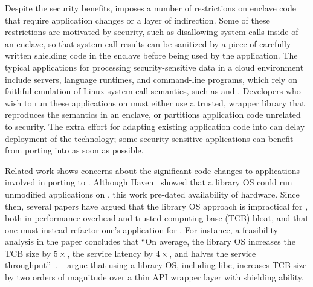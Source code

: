 Despite the security benefits,
\sgx{} imposes a number of restrictions on enclave code 
that require application changes
or a layer of indirection. %
Some of these restrictions are motivated by security, such as disallowing system calls
inside of an enclave, so that system call results can be sanitized by a piece of carefully-written shielding code in the enclave before being used by the application.
The typical applications
for processing security-sensitive data
in a cloud environment
include servers, language runtimes, and
command-line programs,
which rely on faithful emulation of Linux system call semantics, such as  and .
Developers who wish to run these applications on \sgx{}
must either use 
a trusted, wrapper library that reproduces the semantics in an enclave, or partitions application code
unrelated to security.
The extra effort for adapting existing application code
into \sgx{} can delay deployment of the technology; some security-sensitive applications
can benefit from porting into \sgx{} as soon as possible.






Related work shows concerns about the significant code changes to applications involved in porting to \sgx{}.
Although Haven~\cite{baumann14haven} showed that a library OS
could run unmodified applications on \sgx{}, this work pre-dated availability of \sgx{} hardware.
Since then, several papers have argued that the library OS approach is impractical for \sgx{},
both in performance overhead and trusted computing base (TCB) bloat, and that one must instead refactor one's application for \sgx{}.
For instance, a feasibility analysis in the \scone{} paper
concludes that ``On average, the library OS increases the TCB size by $5\times$, the service latency by $4\times$,
and halves the service throughput''~\cite{osdi16scone}.
~\citet{shinde17panoply} argue that using a library OS, including libc, increases TCB size by two orders of magnitude over
a thin API wrapper layer with shielding ability.




